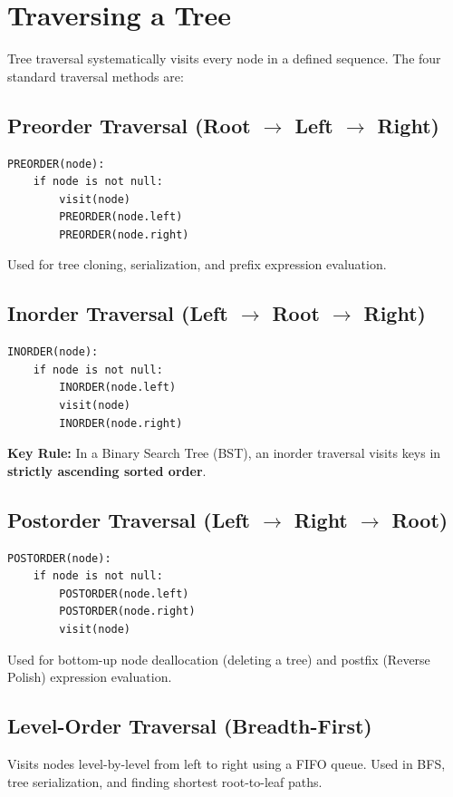 \section{Traversing a Tree}

Tree traversal systematically visits every node in a defined sequence. The four standard traversal methods are:

\subsection{Preorder Traversal (Root $\to$ Left $\to$ Right)}
\begin{lstlisting}[style=pseudocode]
PREORDER(node):
    if node is not null:
        visit(node)
        PREORDER(node.left)
        PREORDER(node.right)
\end{lstlisting}
Used for tree cloning, serialization, and prefix expression evaluation.

\subsection{Inorder Traversal (Left $\to$ Root $\to$ Right)}
\begin{lstlisting}[style=pseudocode]
INORDER(node):
    if node is not null:
        INORDER(node.left)
        visit(node)
        INORDER(node.right)
\end{lstlisting}
\textbf{Key Rule:} In a Binary Search Tree (BST), an inorder traversal visits keys in \textbf{strictly ascending sorted order}.

\subsection{Postorder Traversal (Left $\to$ Right $\to$ Root)}
\begin{lstlisting}[style=pseudocode]
POSTORDER(node):
    if node is not null:
        POSTORDER(node.left)
        POSTORDER(node.right)
        visit(node)
\end{lstlisting}
Used for bottom-up node deallocation (deleting a tree) and postfix (Reverse Polish) expression evaluation.

\subsection{Level-Order Traversal (Breadth-First)}
Visits nodes level-by-level from left to right using a FIFO queue. Used in BFS, tree serialization, and finding shortest root-to-leaf paths.

